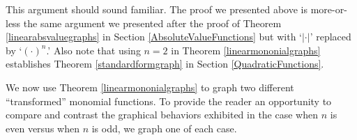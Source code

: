 \documentclass{ximera}
\begin{document}

This argument should sound familiar.  The proof we presented above is more-or-less the same argument we presented after the proof of Theorem \ref{linearabsvaluegraphs} in Section \ref{AbsoluteValueFunctions} but with `$| \cdot |$' replaced by `$(\cdot)^n$.'  Also note that using $n =2$ in Theorem \ref{linearmononialgraphs} establishes Theorem \ref{standardformgraph} in Section \ref{QuadraticFunctions}. 


We now use Theorem \ref{linearmononialgraphs} to graph two different ``transformed'' monomial functions. To provide the reader an opportunity to compare and contrast the graphical behaviors exhibited in the case when $n$ is even versus when $n$ is odd, we graph one of each case.

\end{document}
